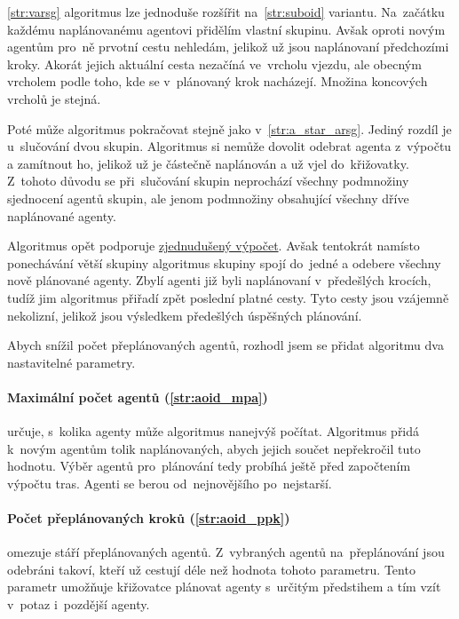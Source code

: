 \ref{str:varsg} algoritmus lze jednoduše rozšířit na~\ref{str:suboid} variantu.
Na~začátku každému naplánovanému agentovi přidělím vlastní skupinu.
Avšak oproti novým agentům pro~ně prvotní cestu nehledám, jelikož už jsou naplánovaní předchozími kroky.
Akorát jejich aktuální cesta nezačíná ve~vrcholu vjezdu,
ale obecným vrcholem podle toho, kde se v~plánovaný krok nacházejí.
Množina koncových vrcholů je stejná.

Poté může algoritmus pokračovat stejně jako v~\ref{str:a_star_arsg}.
Jediný rozdíl je u~slučování dvou skupin.
Algoritmus si nemůže dovolit odebrat agenta z~výpočtu a zamítnout ho,
jelikož už je částečně naplánován a už vjel do~křižovatky.
Z~tohoto důvodu se při~slučování skupin neprochází všechny podmnožiny sjednocení agentů skupin,
ale jenom podmnožiny obsahující všechny dříve naplánované agenty.

Algoritmus opět podporuje \hyperref[par:arsg_zvp]{zjednudušený výpočet}.
Avšak tentokrát namísto ponechávání větší skupiny
algoritmus skupiny spojí do~jedné a odebere všechny nově plánované agenty.
Zbylí agenti již byli naplánovaní v~předešlých krocích, tudíž jim algoritmus přiřadí zpět poslední platné cesty.
Tyto cesty jsou vzájemně nekolizní, jelikož jsou výsledkem předešlých úspěšných plánování.

Abych snížil počet přeplánovaných agentů, rozhodl jsem se přidat algoritmu dva nastavitelné parametry.

\paragraph{Maximální počet agentů (\ref{str:aoid_mpa})} určuje,
s~kolika agenty může algoritmus nanejvýš počítat.
Algoritmus přidá k~novým agentům tolik naplánovaných, abych jejich součet nepřekročil tuto hodnotu.
Výběr agentů pro~plánování tedy probíhá ještě před započtením výpočtu tras.
Agenti se berou od~nejnovějšího po~nejstarší.

\paragraph{Počet přeplánovaných kroků (\ref{str:aoid_ppk})}
omezuje stáří přeplánovaných agentů.
Z~vybraných agentů na~přeplánování jsou odebráni takoví, kteří už cestují déle než hodnota tohoto parametru.
Tento parametr umožňuje křižovatce plánovat agenty s~určitým předstihem a tím vzít v~potaz i~pozdější agenty.
